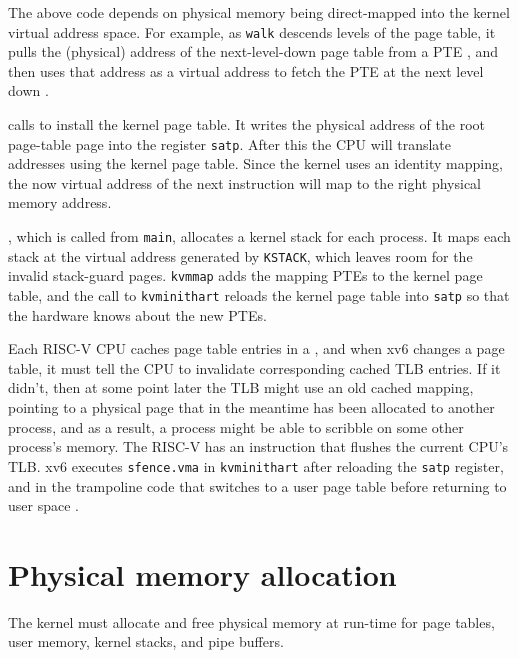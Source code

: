 The above code depends on physical memory being direct-mapped into the
kernel virtual address space. For example, as \lstinline{walk} descends levels
of the page table, it pulls the (physical) address of the
next-level-down page table from a PTE ,
and then uses that address as a
virtual address to fetch the PTE at the next level down
.

calls
to install the kernel page table.
It writes the physical address of the root page-table page
into the register
\texttt{satp}.
After this the CPU will translate addresses using the kernel
page table.  Since the kernel uses an identity mapping, the now
virtual address of the next instruction will map to the right physical
memory address.

 , which is
called from \lstinline{main}, allocates a kernel stack for each
process. It maps each stack at the virtual address generated by
\lstinline{KSTACK}, which leaves room for the invalid stack-guard
pages. \lstinline{kvmmap} adds the mapping PTEs to the kernel page
table, and the call to \lstinline{kvminithart} reloads the kernel page
table into \texttt{satp} so that the hardware knows about the new
PTEs.

Each RISC-V CPU caches page table entries in a
, and when xv6 changes
a page table, it must tell the CPU to invalidate corresponding
cached TLB entries.  If it didn't,
then at some point later the TLB might
use an old cached mapping, pointing to a physical page that in the meantime
has been allocated to another process, and as a result, a process
might be able to scribble on some other process's memory.  The RISC-V
has an instruction  that flushes
the current CPU's TLB.
xv6 executes {\tt sfence.vma} in {\tt kvminithart}  after reloading the 
\texttt{satp} register, and in the trampoline code that
switches to a user page table before returning to user space
.

\section{Physical memory allocation}

The kernel must allocate and free physical memory at run-time for
page tables,
user memory,
kernel stacks,
and pipe buffers.

